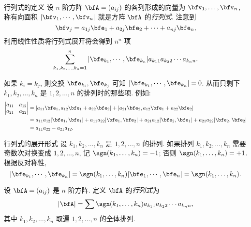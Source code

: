 \begin{frame}{行列式的定义\noexer}
	\onslide<+->
	设 $n$ 阶方阵 $\bfA=(a_{ij})$ 的各列形成的向量为 $\bfv_1,\dots,\bfv_n$,
	\onslide<+->
	称有向面积 $|\bfv_1,\cdots,\bfv_n|$ 就是方阵 $\bfA$ 的\emph{行列式}.
	\onslide<+->
	注意到
	\[\bfv_j=a_{1j}\bfe_1+a_{2j}\bfe_2+\cdots+a_{nj}\bfe_n,\]
	\onslide<+->
	利用线性性质将行列式展开将会得到 $n^n$ 项
	\[\sum_{k_1,k_2,\dots,k_n=1}^n|\bfe_{k_1},\cdots,\bfe_{k_n}| a_{k_11}a_{k_22}\cdots a_{k_nn}.\]

	\onslide<+->
	如果 $k_i=k_j$, 则交换 $\bfe_{k_i},\bfe_{k_j}$ 可知 $|\bfe_{k_1},\cdots,\bfe_{k_n}|=0$.
	\onslide<+->
	从而只剩下 $k_1,k_2,\dots,k_n$ 是 $1,2,\dots,n$ 的排列时的那些项.
	\onslide<+->
	例如: 
	\begin{align*}
		\begin{vmatrix}
			a_{11}&a_{12}\\
			a_{21}&a_{22}
		\end{vmatrix}&=|a_{11}\bfe_1,a_{12}\bfe_1+a_{22}\bfe_2|+|a_{21}\bfe_2,a_{12}\bfe_1+a_{22}\bfe_2|\\
		&=a_{11}a_{12}|\bfe_1,\bfe_1|+a_{11}a_{22}|\bfe_1,\bfe_2|+a_{21}a_{12}|\bfe_2,\bfe_1|+a_{21}a_{22}|\bfe_2,\bfe_2|\\
		&=a_{11}a_{22}-a_{21}a_{12}.
	\end{align*}
\end{frame}
	
	
\begin{frame}{行列式的展开形式\noexer}
	\onslide<+->
	设 $k_1,k_2,\dots,k_n$ 是 $1,2,\dots,n$ 的排列.
	\onslide<+->
	如果排列 $k_1,k_2,\dots,k_n$ 需要奇数次对换变成 $1,2,\dots,n$, 记 	$\sgn(k_1,\dots,k_n)=-1$; 否则 $\sgn(k_1,\dots,k_n)=+1$.
	\onslide<+->
	根据反对称性,
	\[|\bfe_{k_1},\cdots,\bfe_{k_n}|=\sgn(k_1,\dots,k_n)|\bfe_1,\cdots,\bfe_n|=\sgn(k_1,\dots,k_n).\]
	\onslide<+->
	\begin{definition}
		设 $\bfA=(a_{ij})$ 是 $n$ 阶方阵.
		定义 $\bfA$ 的\emph{行列式}为
		\[|\bfA|=\sum \sgn(k_1,\dots,k_n) a_{k_11}a_{k_22}\cdots a_{k_nn},\]
		其中 $k_1,k_2,\dots,k_n$ 取遍 $1,2,\dots,n$ 的全体排列.
	\end{definition}
\end{frame}


